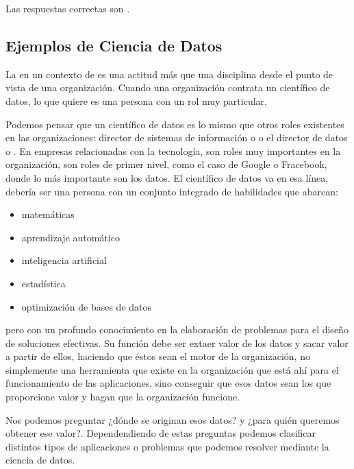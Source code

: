 Las respuestas correctas son .

\subsection{Ejemplos de Ciencia de Datos}

La  en un contexto de  es una actitud más que una disciplina desde el punto de vista de una organización. Cuando una organización contrata un científico de datos, lo que quiere es una persona con un rol muy particular.

Podemos pensar que un científico de datos es lo mismo que otros roles existentes en las organizaciones: director de sistemas de información o  o el director de datos o . En empresas relacionadas con la tecnología, son roles muy importantes en la organización, son roles de primer nivel, como el caso de Google o Fracebook, donde lo más importante son los datos. El científico de datos va en esa línea, debería ser una persona con un conjunto integrado de habilidades que abarcan:
\begin{itemize}
    \item matemáticas
    \item aprendizaje automático
    \item inteligencia artificial
    \item estadística
    \item optimización de bases de datos
\end{itemize}
pero con un profundo conocimiento en la elaboración de problemas para el diseño de soluciones efectivas. Su función debe ser extaer valor de los datos y sacar valor a partir de ellos, haciendo que éstos sean el motor de la organización, no simplemente una herramienta que existe en la organización  que está ahí para el funcionamiento de las aplicaciones, sino conseguir que esos datos sean los que proporcione valor y hagan que la organización funcione.


Nos podemos preguntar ¿dónde se originan esos datos? y ¿para quién queremos obtener ese valor?. Dependendiendo de estas preguntas podemos clasificar distintos tipos de aplicaciones o problemas que podemos resolver mediante la ciencia de datos.


